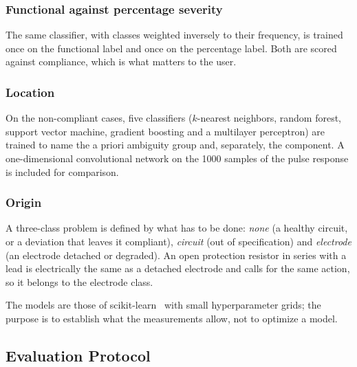 \subsubsection{Functional against percentage severity}
The same classifier, with classes weighted inversely to their frequency, is trained once on the
functional label and once on the percentage label. Both are scored against compliance, which is
what matters to the user.

\subsubsection{Location}
On the non-compliant cases, five classifiers ($k$-nearest neighbors, random forest, support
vector machine, gradient boosting and a multilayer perceptron) are trained to name the a priori
ambiguity group and, separately, the component. A one-dimensional convolutional network on the
\num{1000} samples of the pulse response is included for comparison.

\subsubsection{Origin}
A three-class problem is defined by what has to be done: \emph{none} (a healthy circuit, or a
deviation that leaves it compliant), \emph{circuit} (out of specification) and \emph{electrode}
(an electrode detached or degraded). An open protection resistor in series with a lead is
electrically the same as a detached electrode and calls for the same action, so it belongs to the
electrode class.

The models are those of scikit-learn~\cite{pedregosa2011} with small hyperparameter grids; the
purpose is to establish what the measurements allow, not to optimize a model.

\subsection{Evaluation Protocol}

